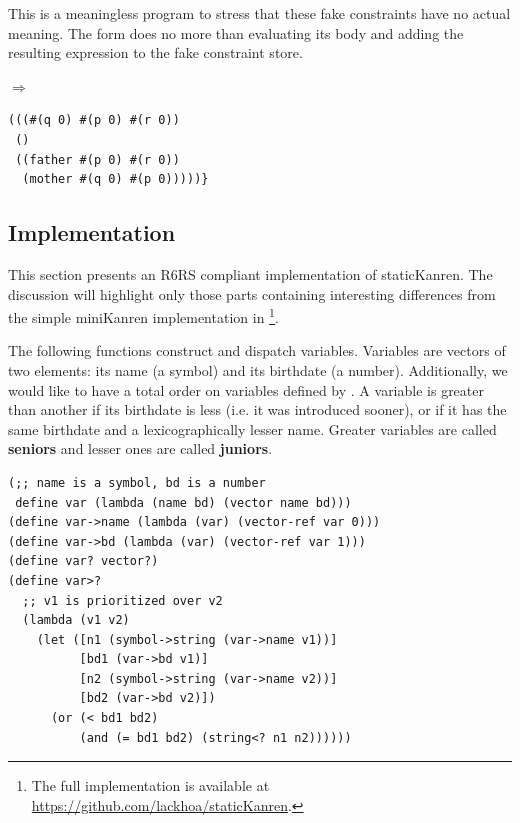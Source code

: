 This is a meaningless program to stress that these fake constraints have no actual meaning. The  form does no more than evaluating its body and adding the resulting expression to the fake constraint store.

$\Rightarrow$
\begin{lstlisting}
(((#(q 0) #(p 0) #(r 0))
 ()
 ((father #(p 0) #(r 0))
  (mother #(q 0) #(p 0)))))}
\end{lstlisting}



\subsection{Implementation}\label{static_imp}
This section presents an R6RS compliant implementation of staticKanren. The discussion will highlight only those parts containing interesting differences from the simple miniKanren implementation in \textcite{byrdphd}\footnote{The full implementation is available at \url{https://github.com/lackhoa/staticKanren}.}.

The following functions construct and dispatch variables. Variables are vectors of two elements: its name (a symbol) and its birthdate (a number). Additionally, we would like to have a total order on variables defined by . A variable is greater than another if its birthdate is less (i.e. it was introduced sooner), or if it has the same birthdate and a lexicographically lesser name. Greater variables are called \textbf{seniors} and lesser ones are called \textbf{juniors}.
\begin{lstlisting}
(;; name is a symbol, bd is a number
 define var (lambda (name bd) (vector name bd)))
(define var->name (lambda (var) (vector-ref var 0)))
(define var->bd (lambda (var) (vector-ref var 1)))
(define var? vector?)
(define var>?
  ;; v1 is prioritized over v2
  (lambda (v1 v2)
    (let ([n1 (symbol->string (var->name v1))]
          [bd1 (var->bd v1)]
          [n2 (symbol->string (var->name v2))]
          [bd2 (var->bd v2)])
      (or (< bd1 bd2)
          (and (= bd1 bd2) (string<? n1 n2))))))
\end{lstlisting}

